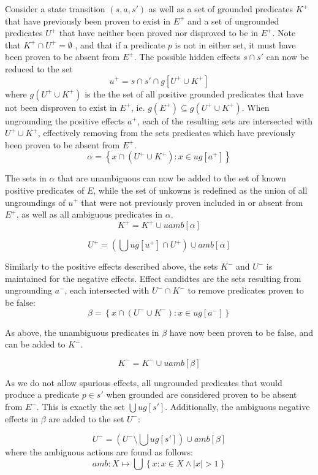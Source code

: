 \documentclass[../master.tex]{subfiles}
\begin{document}
Consider a state transition $\left(s,a,s'\right)$ as well as a set
of grounded predicates $K^{+}$ that have previously been proven to
exist in $E^{+}$ and a set of ungrounded predicates $U^{+}$ that
have neither been proved nor disproved to be in $E^{+}$. Note that
$K^{+}\cap U^{+}=\emptyset$ , and that if a predicate $p$ is not
in either set, it must have been proven to be absent from $E^{+}$.
The possible hidden effects $s\cap s'$ can now be reduced to the
set
\[
u^{+}=s\cap s'\cap g\left[U^{+}\cup K^{+}\right]
\]
where $g\left(U^{+}\cup K^{+}\right)$ is the the set of all positive
grounded predicates that have not been disproven to exist in $E^{+}$,
ie. $g\left(E^{+}\right)\subseteq g\left(U^{+}\cup K^{+}\right)$.
When ungrounding the positive effects $a^{+}$, each of the resulting
sets are intersected with $U^{+}\cup K^{+}$, effectively removing
from the sets predicates which have previously been proven to be absent
from $E^{+}$.
\[
\alpha=\left\{ x\cap\left(U^{+}\cup K^{+}\right):x\in ug\left[a^{+}\right]\right\}
\]


The sets in $\alpha$ that are unambiguous can now be added to the
set of known positive predicates of $E$, while the set of unkowns
is redefined as the union of all ungroundings of $u^{+}$ that were
not previously proven included in or absent from $E^{+}$, as well
as all ambiguous predicates in $\alpha$.
\[
K^{+}=K^{+}\cup uamb\left[\alpha\right]
\]


\[
U^{+}=\left(\bigcup ug\left[u^{+}\right]\cap U^{+}\right)\cup amb\left[\alpha\right]
\]


Similarly to the positive effects described above, the sets $K^{-}$
and $U^{-}$ is maintained for the negative effects. Effect candidtes
are the sets resulting from ungrounding $a^{-}$, each intersected
with $U^{-}\cap K^{-}$ to remove predicates proven to be false:
\[
\beta=\left\{ x\cap\left(U^{-}\cup K^{-}\right):x\in ug\left[a^{-}\right]\right\}
\]


As above, the unambiguous predicates in $\beta$ have now been proven
to be false, and can be added to $K^{-}$.

\[
K^{-}=K^{-}\cup uamb\left[\beta\right]
\]


As we do not allow spurious effects, all ungrounded predicates that
would produce a predicate $p\in s'$ when grounded are considered
proven to be absent from $E^{-}$. This is exactly the set $\bigcup ug\left[s'\right]$.
Additionally, the ambiguous negative effects in $\beta$ are added
to the set $U^{-}$:

\[
U^{-}=\left(U^{-}\setminus\bigcup ug\left[s'\right]\right)\cup amb\left[\beta\right]
\]
where the ambiguous actions are found as follows:
\[
amb:X\mapsto\bigcup\left\{ x:x\in X\land|x|>1\right\}
\]
\end{document}
